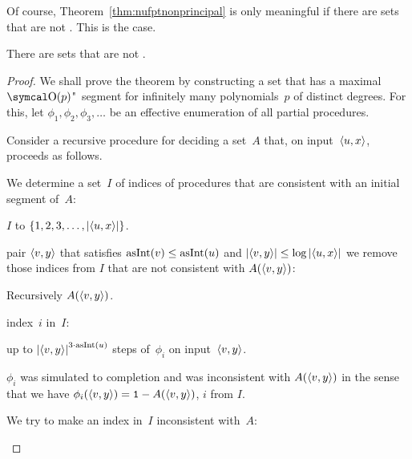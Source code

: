 Of course, Theorem~\ref{thm:nufptnonprincipal} is only meaningful if there are  sets that are not .
This is the case.
\begin{theorem}
  There are  sets that are not .
\end{theorem}
\begin{proof}
  We shall prove the theorem by constructing a  set that has a maximal $\bigO(p)$"~segment for infinitely many polynomials~$p$ of distinct degrees.
  For this, let $\phi_1, \phi_2, \phi_3, \ldots$ be an effective enumeration of all partial procedures.

  Consider a recursive procedure for deciding a set~$A$ that, on input~${\langle u, x\rangle}$, proceeds as follows.
  \begin{codelisting}
  \item
    We determine a set~$I$ of indices of procedures that are consistent with an initial segment of~$A$:
    \begin{codelisting}
    \item
       $I$ to $\{1, 2, 3, \ldots, \length{\pair{u}{x}}\}$.
    \item
       pair $\pair{v}{y}$ that satisfies $\asNat(v) \le \asNat(u)$ and $\length{\pair{v}{y}} \le \log \length{\pair{u}{x}}$ we remove those indices from $I$ that are not consistent with $A(\pair{v}{y})$:
      \begin{codelisting}
      \item
        Recursively  $A(\pair{v}{y})$.
      \item
         index~$i$ in~$I$:
        \begin{codelisting}
        \item
           up to $\length{\pair{v}{y}}^{3 \cdot \asNat(u)}$ steps of~$\phi_i$ on input~$\pair{v}{y}$.
        \item
           $\phi_i$ was simulated to completion and was inconsistent with $A(\pair{v}{y})$ in the sense that we have $\phi_i(\pair{v}{y}) = \bits{1} - A(\pair{v}{y})$,
          \itemcont {} $i$ from $I$.
        \end{codelisting}
      \end{codelisting}
    \end{codelisting}
  \item
    We try to make an index in~$I$ inconsistent with~$A$:
    \begin{codelisting}

\end{codelisting}
\end{codelisting}
\end{proof}
